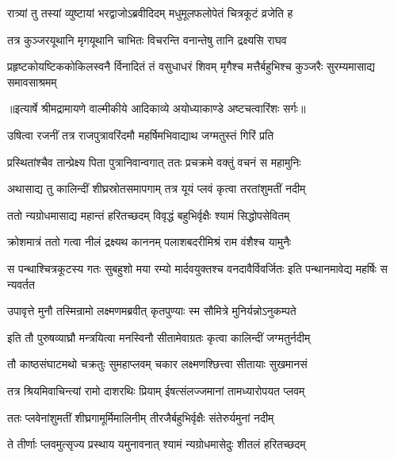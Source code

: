 \twolineshloka
{रात्र्यां तु तस्यां व्युष्टायां भरद्वाजोऽब्रवीदिदम्}
{मधुमूलफलोपेतं चित्रकूटं व्रजेति ह} %

\twolineshloka
{तत्र कुञ्जरयूथानि मृगयूथानि चाभितः}
{विचरन्ति वनान्तेषु तानि द्रक्ष्यसि राघव} %

\fourlineindentedshloka
{प्रहृष्टकोयष्टिककोकिलस्वनै}
{र्विनादितं तं वसुधाधरं शिवम्}
{मृगैश्च मत्तैर्बहुभिश्च कुञ्जरैः}
{ सुरम्यमासाद्य समावसाश्रमम्} %


{॥इत्यार्षे श्रीमद्रामायणे वाल्मीकीये आदिकाव्ये अयोध्याकाण्डे अष्टचत्वारिंशः सर्गः॥}


\twolineshloka
{उषित्वा रजनीं तत्र राजपुत्रावरिंदमौ}
{महर्षिमभिवाद्याथ जग्मतुस्तं गिरिं प्रति} %

\twolineshloka
{प्रस्थितांश्चैव तान्प्रेक्ष्य पिता पुत्रानिवान्वगात्}
{ततः प्रचक्रमे वक्तुं वचनं स महामुनिः} %

\twolineshloka
{अथासाद्य तु कालिन्दीं शीघ्रस्रोतसमापगाम्}
{तत्र यूयं प्लवं कृत्वा तरतांशुमतीं नदीम्} %

\twolineshloka
{ततो न्यग्रोधमासाद्य महान्तं हरितच्छदम्}
{विवृद्धं बहुभिर्वृक्षैः श्यामं सिद्धोपसेवितम्} %

\twolineshloka
{क्रोशमात्रं ततो गत्वा नीलं द्रक्ष्यथ काननम्}
{पलाशबदरीमिश्रं राम वंशैश्च यामुनैः} %

\threelineshloka
{स पन्थाश्चित्रकूटस्य गतः सुबहुशो मया}
{रम्यो मार्दवयुक्तश्च वनदावैर्विवर्जितः}
{इति पन्थानमावेद्य महर्षिः स न्यवर्तत} %

\twolineshloka
{उपावृत्ते मुनौ तस्मिन्रामो लक्ष्मणमब्रवीत्}
{कृतपुण्याः स्म सौमित्रे मुनिर्यन्नोऽनुकम्पते} %

\twolineshloka
{इति तौ पुरुषव्याघ्रौ मन्त्रयित्वा मनस्विनौ}
{सीतामेवाग्रतः कृत्वा कालिन्दीं जग्मतुर्नदीम्} %

\twolineshloka
{तौ काष्ठसंघाटमथो चक्रतुः सुमहाप्लवम्}
{चकार लक्ष्मणश्छित्त्वा सीतायाः सुखमानसं} %

\twolineshloka
{तत्र श्रियमिवाचिन्त्यां रामो दाशरथिः प्रियाम्}
{ईषत्संलज्जमानां तामध्यारोपयत प्लवम्} %

\twolineshloka
{ततः प्लवेनांशुमतीं शीघ्रगामूर्मिमालिनीम्}
{तीरजैर्बहुभिर्वृक्षैः संतेरुर्यमुनां नदीम्} %

\twolineshloka
{ते तीर्णाः प्लवमुत्सृज्य प्रस्थाय यमुनावनात्}
{श्यामं न्यग्रोधमासेदुः शीतलं हरितच्छदम्} %

